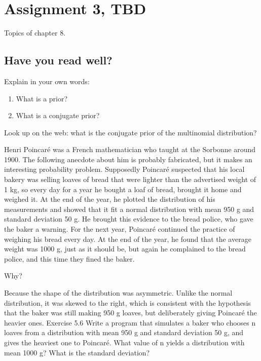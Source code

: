 \documentclass[assignments]{subfiles}
\begin{document}
\section{Assignment 3, TBD}
\label{sec:assignment-3}

Topics of chapter 8.

\subsection{Have you read well?}
\label{sec:have-you-read-1}

\begin{exercise}
Explain in your own words:
\begin{enumerate}
\item What is a prior?
\item What is a conjugate prior?
\end{enumerate}
\end{exercise}

\begin{exercise}
Look up on the web: what is the conjugate prior of the multinomial distribution?
\end{exercise}



\begin{exercise}
Henri Poincaré was a French mathematician who taught at the Sorbonne around 1900.
The following anecdote about him is probably fabricated, but it makes an interesting probability problem.
Supposedly Poincaré suspected that his local bakery was selling loaves of bread that were lighter than the advertised weight of 1 kg, so every day for a year he bought a loaf of bread, brought it home and weighed it.
At the end of the year, he plotted the distribution of his measurements and showed that it fit a normal distribution with mean 950 g and standard deviation 50 g.
He brought this evidence to the bread police, who gave the baker a warning.
For the next year, Poincaré continued the practice of weighing his bread every day.
At the end of the year, he found that the average weight was 1000 g, just as it should be, but again he complained to the bread police, and this time they fined the baker.


Why?

\begin{solution}
Because the shape of the distribution was asymmetric. Unlike the normal distribution, it was skewed to the right, which is consistent with the hypothesis that the baker was still making 950 g loaves, but deliberately giving Poincaré the heavier ones.
Exercise 5.6 Write a program that simulates a baker who chooses n loaves from a distribution with mean 950 g and standard deviation 50 g, and gives the heaviest one to Poincaré. What value of n yields a distribution with mean 1000 g? What is the standard deviation?
\end{solution}

\end{exercise}
\end{document}
